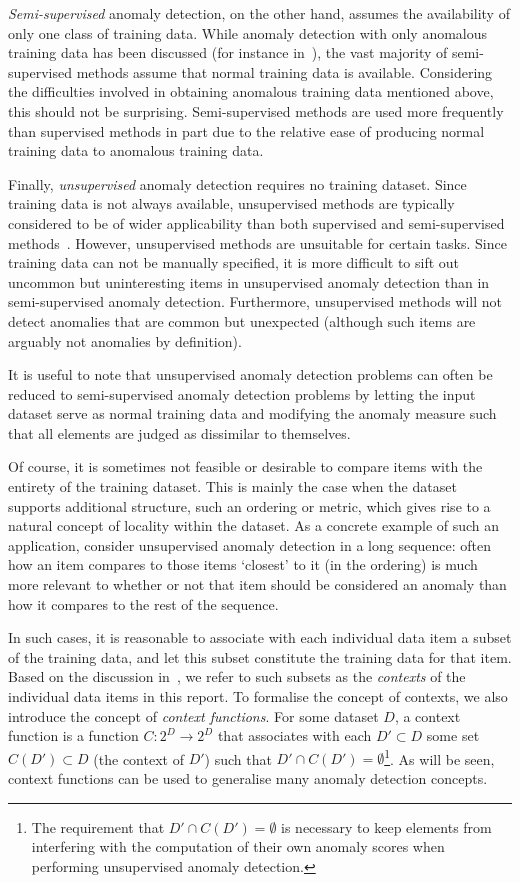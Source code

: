 \emph{Semi-supervised} anomaly detection, on the other hand, assumes the availability of only one class of training data. While anomaly detection with only anomalous training data has been discussed (for instance in~\cite{dasgupta}), the vast majority of semi-supervised methods assume that normal training data is available. Considering the difficulties involved in obtaining anomalous training data mentioned above, this should not be surprising. Semi-supervised methods are used more frequently than supervised methods in part due to the relative ease of producing normal training data to anomalous training data.

Finally, \emph{unsupervised} anomaly detection requires no training dataset. Since training data is not always available, unsupervised methods are typically considered to be of wider applicability than both supervised and semi-supervised methods~\cite{chandola}. However, unsupervised methods are unsuitable for certain tasks. Since training data can not be manually specified, it is more difficult to sift out uncommon but uninteresting items in unsupervised anomaly detection than in semi-supervised anomaly detection. Furthermore, unsupervised methods will not detect anomalies that are common but unexpected (although such items are arguably not anomalies by definition).

It is useful to note that unsupervised anomaly detection problems can often be reduced to semi-supervised anomaly detection problems by letting the input dataset serve as normal training data and modifying the anomaly measure such that all elements are judged as dissimilar to themselves.

Of course, it is sometimes not feasible or desirable to compare items with the entirety of the training dataset. This is mainly the case when the dataset supports additional structure, such an ordering or metric, which gives rise to a natural concept of locality within the dataset. As a concrete example of such an application, consider unsupervised anomaly detection in a long sequence: often how an item compares to those items `closest' to it (in the ordering) is much more relevant to whether or not that item should be considered an anomaly than how it compares to the rest of the sequence.

In such cases, it is reasonable to associate with each individual data item a subset of the training data, and let this subset constitute the training data for that item. Based on the discussion in~\cite{chandola}, we refer to such subsets as the \emph{contexts} of the individual data items in this report. To formalise the concept of contexts, we also introduce the concept of \emph{context functions}. For some dataset $D$, a context function is a function $C: 2^D \rightarrow 2^D$ that associates with each $D' \subset D$ some set $C(D') \subset D$ (the context of $D'$) such that $D' \cap C(D') = \emptyset$\footnote{The requirement that $D' \cap C(D') = \emptyset$ is necessary to keep elements from interfering with the computation of their own anomaly scores when performing unsupervised anomaly detection.}. As will be seen, context functions can be used to generalise many anomaly detection concepts.

